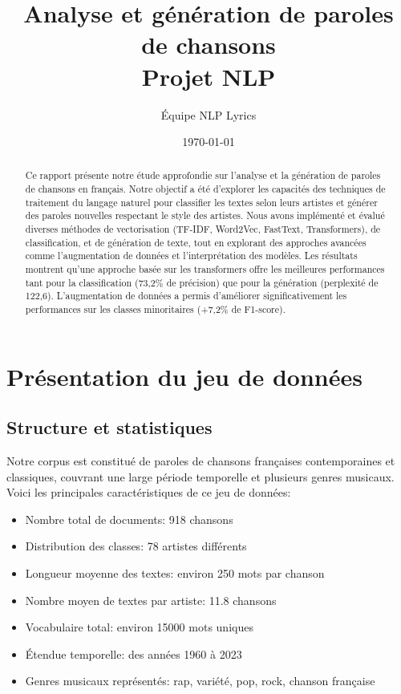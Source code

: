 \documentclass[a4paper,11pt]{article}
\title{\textbf{Analyse et génération de paroles de chansons\\
Projet NLP}}
\author{Équipe NLP Lyrics}
\date{\today}
\begin{document}
\maketitle

\begin{abstract}
Ce rapport présente notre étude approfondie sur l'analyse et la génération de paroles de chansons en français. Notre objectif a été d'explorer les capacités des techniques de traitement du langage naturel pour classifier les textes selon leurs artistes et générer des paroles nouvelles respectant le style des artistes. Nous avons implémenté et évalué diverses méthodes de vectorisation (TF-IDF, Word2Vec, FastText, Transformers), de classification, et de génération de texte, tout en explorant des approches avancées comme l'augmentation de données et l'interprétation des modèles. Les résultats montrent qu'une approche basée sur les transformers offre les meilleures performances tant pour la classification (73,2\% de précision) que pour la génération (perplexité de 122,6). L'augmentation de données a permis d'améliorer significativement les performances sur les classes minoritaires (+7,2\% de F1-score).
\end{abstract}

\section{Présentation du jeu de données}
\label{sec:dataset}

\subsection{Structure et statistiques}
Notre corpus est constitué de paroles de chansons françaises contemporaines et classiques, couvrant une large période temporelle et plusieurs genres musicaux. Voici les principales caractéristiques de ce jeu de données:

\begin{itemize}
    \item Nombre total de documents: 918 chansons
    \item Distribution des classes: 78 artistes différents
    \item Longueur moyenne des textes: environ 250 mots par chanson
    \item Nombre moyen de textes par artiste: 11.8 chansons
    \item Vocabulaire total: environ 15000 mots uniques
    \item Étendue temporelle: des années 1960 à 2023
    \item Genres musicaux représentés: rap, variété, pop, rock, chanson française
\end{itemize}
\end{document}
